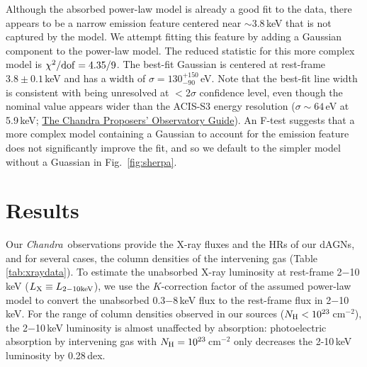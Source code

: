 \documentclass[iop,revtex4,twocolumn,apj,numberedappendix,appendixfloats]{emulateapj}
\newcommand{\chandra}{{\it Chandra}}
\begin{document}
Although the absorbed power-law model is already a good fit to the data, there appears to be a narrow emission feature centered near $\sim$3.8\,keV that is not captured by the model. We attempt fitting this feature by adding a Gaussian component to the power-law model. The reduced statistic for this more complex model is $\chi^{2}/{\rm dof} = 4.35/9$. The best-fit Gaussian is centered at rest-frame $3.8\pm0.1$\,keV and has a width of $\sigma = 130^{+150}_{-90}$\,eV. Note that the best-fit line width is consistent with being unresolved at $<$2$\sigma$ confidence level, even though the nominal value appears wider than the ACIS-S3 energy resolution ($\sigma \sim 64$\,eV at 5.9\,keV; \href{http://cxc.harvard.edu/proposer/POG/html/chap6.html#tth_sEc6.7}{The Chandra Proposers' Observatory Guide}). 
An F-test suggests that a more complex model containing a Gaussian to account for the emission feature does not significantly improve the fit, and so we default to the simpler model without a Guassian in Fig.~\ref{fig:sherpa}.

\section{Results} \label{sec:results}

Our \chandra\ observations provide the X-ray fluxes and the HRs of our dAGNs, and for several cases, the column densities of the intervening gas (Table\,\ref{tab:xraydata}). To estimate the unabsorbed X-ray luminosity at rest-frame 2$-$10\,keV ($L_{\rm X} \equiv L_{\rm 2-10 keV}$), we use the $K$-correction factor of the assumed power-law model to convert the unabsorbed 0.3$-$8\,keV flux to the rest-frame flux in 2$-$10\,keV.
%
For the range of column densities observed in our sources ($N_{\rm H} < 10^{23}$\,cm$^{-2}$), the 2$-$10\,keV luminosity is almost unaffected by absorption: photoelectric absorption by intervening gas with $N_{\rm H} = 10^{23}$\,cm$^{-2}$ only decreases the 2-10\,keV luminosity by 0.28\,dex. 
\end{document}
